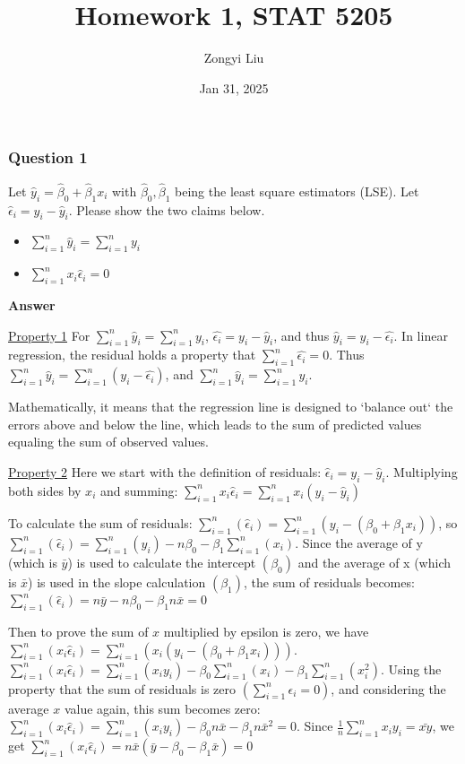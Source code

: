 \documentclass[margin=1in]{article}
\title{Homework 1, STAT 5205}
\author{Zongyi Liu}
\date{Jan 31, 2025}
\begin{document}
		\maketitle
		
		\subsubsection*{Question 1}
		Let $\hat{y}_i=\hat{\beta}_0+\hat{\beta}_1 x_i$ with $\hat{\beta}_0, \hat{\beta}_1$ being the least square estimators (LSE). Let $\hat{\epsilon}_i=y_i-\hat{y}_i$. Please show the two claims below.
		
		\begin{itemize}
			\item  $\sum_{i=1}^n \hat{y}_i=\sum_{i=1}^n y_i$
			\item $\sum_{i=1}^n x_i \hat{\epsilon}_i=0$
		\end{itemize}
	
	\textbf{Answer}
	
	  \underline{Property 1} For $\sum_{i=1}^n \hat{y}_i=\sum_{i=1}^n y_i$, $\hat{\epsilon_i}=y_i - \hat{y}_i$, and thus $\hat{y}_i=y_i - \hat{\epsilon_i}$. In linear regression, the residual holds a property that $\sum_{i=1}^n\hat{\epsilon_i} =0$. Thus $\sum_{i=1}^n \hat{y}_i =\sum_{i=1}^n (y_i - \hat{\epsilon_i}) $, and $\sum_{i=1}^n \hat{y}_i=\sum_{i=1}^n y_i$.
	  
	  Mathematically, it means that the regression line is designed to `balance out‘ the errors above and below the line, which leads to the sum of predicted values equaling the sum of observed values. 
	  
	  \underline{Property 2} Here we start with the definition of residuals: $ \hat{\epsilon}_i = y_i - \hat{y}_i$. Multiplying both sides by \(x_i\) and summing: $ \sum_{i=1}^{n} x_i \hat{\epsilon}_i = \sum_{i=1}^{n} x_i (y_i - \hat{y}_i)$ 
	  
	  To calculate the sum of residuals: $ \sum_{i=1}^n(\hat{\epsilon}_i)=\sum_{i=1}^n \left(y_i-\left(\beta_0+\beta_1 x_i\right)\right)$, so $\sum_{i=1}^n(\hat{\epsilon}_i)=\sum_{i=1}^n(y_i)-n \beta_0-\beta_1 \sum_{i=1}^n(x_i)$. Since the average of y (which is $\bar{y}$) is used to calculate the intercept $\left(\beta_0\right)$ and the average of x (which is $\bar{x}$) is used in the slope calculation $\left(\beta_1\right)$, the sum of residuals becomes: $\sum_{i=1}^n(\hat{\epsilon}_i)=n \bar{y}-n \beta_0-\beta_1{ }n \bar{x}=0$
	  
	  Then to prove the sum of $x$ multiplied by epsilon is zero, we have  $\sum_{i=1}^n\left(x_i \hat{\epsilon}_i\right)=\sum_{i=1}^n\left(x_i \left(y_i-\left(\beta_0+\beta_1 x_i\right)\right)\right)$. $\sum_{i=1}^n\left(x_i \hat{\epsilon}_i \right)=\sum_{i=1}^n\left(x_i y_i\right)-\beta_0 \sum_{i=1}^n(x_i)-\beta_1 \sum_{i=1}^n\left(x_i^2\right)$. Using the property that the sum of residuals is zero $(\sum_{i=1}^n \epsilon_i=0)$, and considering the average $x$ value again, this sum becomes zero: $\sum_{i=1}^n\left(x_i \hat{\epsilon}_i\right)=\sum_{i=1}^n\left(x_i y_i\right)-\beta_0 n \bar{x}-\beta_1 n \bar{x}^2=0$. Since $\frac{1}{n}\sum_{i=1}^{n} x_iy_i =\bar{xy}$, we get  $\sum_{i=1}^n\left(x_i \hat{\epsilon}_i\right) = n\bar{x} (\bar{y}-\beta_0-\beta_1{\bar{x}})=0$
	  
\end{document}
